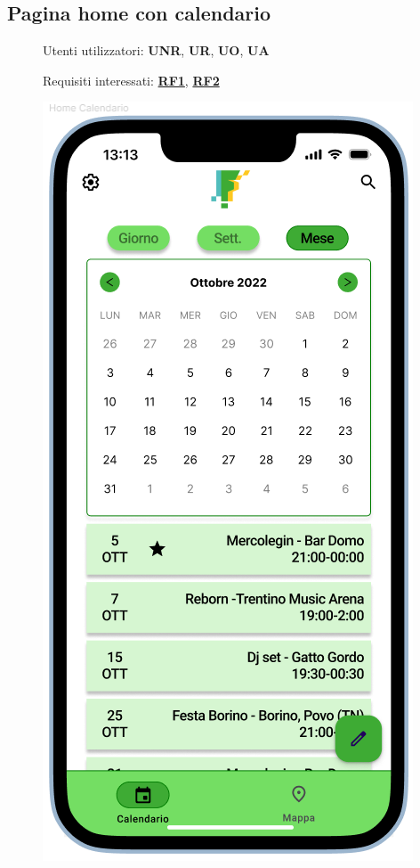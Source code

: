 \documentclass{article}
\begin{document}
\subsection{Pagina home con calendario}
\begin{description}
    \item[] Utenti utilizzatori: \textbf{UNR}, \textbf{UR}, \textbf{UO}, \textbf{UA}
    \item[] Requisiti interessati: \hyperref[rf_1]{\textbf{RF1}}, \hyperref[rf_2]{\textbf{RF2}}
    \item[] \begin{center}
              \includegraphics[scale=0.6]{Home_Calendario.png}

\end{center}
\end{description}
\end{document}
